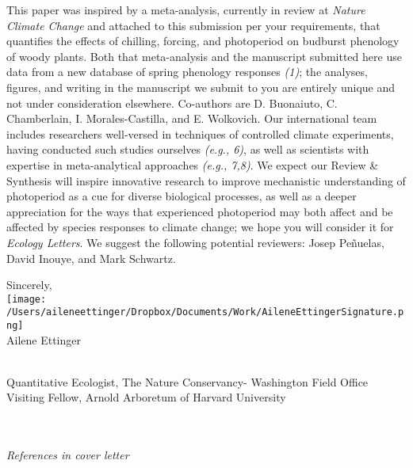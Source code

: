 \documentclass[11pt,a4paper]{letter}
\begin{document}
\begin{letter}{}
\par This paper was inspired by a meta-analysis, currently in review at \emph{Nature Climate Change} and attached to this submission per your requirements, that quantifies the effects of chilling, forcing, and photoperiod on budburst phenology of woody plants. Both that meta-analysis and the manuscript submitted here use data from a new database of spring phenology responses \emph{(1)}; the analyses, figures, and writing in the manuscript we submit to you are entirely unique and not under consideration elsewhere. Co-authors are D. Buonaiuto, C. Chamberlain, I. Morales-Castilla, and E. Wolkovich.  Our international team includes researchers well-versed in techniques of controlled climate experiments, having conducted such studies ourselves  \emph{(e.g., 6)}, as well as scientists with expertise in meta-analytical approaches  \emph{(e.g., 7,8)}. We expect our Review \& Synthesis will inspire innovative research to improve mechanistic understanding of photoperiod as a cue for diverse biological processes, as well as a deeper appreciation for the ways that experienced photoperiod may both affect and be affected by species responses to climate change; we hope you will consider it for \emph{Ecology Letters}. We suggest the following potential reviewers: Josep Pe\~nuelas, David Inouye, and Mark Schwartz.

Sincerely,\\

\texttt{[image: /Users/aileneettinger/Dropbox/Documents/Work/AileneEttingerSignature.png]} \\
Ailene Ettinger
\begin{footnotesize}\\
Quantitative Ecologist, The Nature Conservancy- Washington Field Office\\
Visiting Fellow, Arnold Arboretum of Harvard University 
\end{footnotesize}
\\
\\
\noindent \emph{References in cover letter}


\end{letter}
\end{document}
